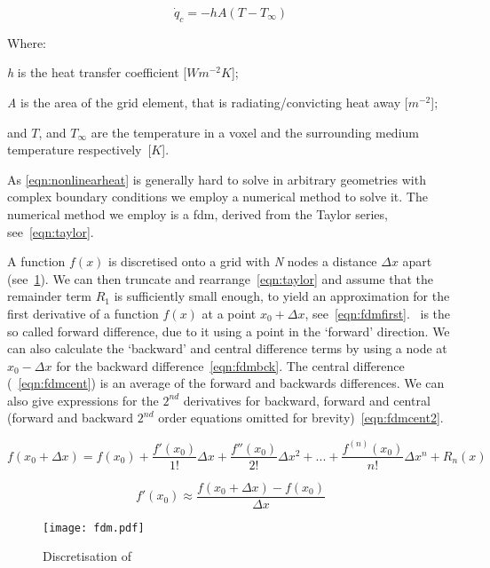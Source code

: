 \begin{equation}
\dot{q}_c = -hA(T - T_\infty)
\label{eqn:bceqns}
\end{equation}

\noindent Where:

	\indent \textit{h} is the heat transfer coefficient [$W m^{-2} K$];
	
	\indent \textit{A} is the area of the grid element, that is radiating/convicting heat away [$m^{-2}$];
	
	\indent and $T$, and $T_\infty$ are the temperature in a voxel and the surrounding medium temperature respectively~[$K$].
	
	\medskip

As \cref{eqn:nonlinearheat} is generally hard to solve in arbitrary geometries with complex boundary conditions we employ a numerical method to solve it.
The numerical method we employ is a \gls{fdm}, derived from the Taylor series, see~\cref{eqn:taylor}. 


A function $f(x)$ is discretised onto a grid with \textit{N} nodes a distance $\Delta x$ apart (see~\cref{fig:fdmexplain}). We can then truncate and rearrange~\cref{eqn:taylor} and assume that the remainder term $R_1$ is sufficiently small enough, to yield an approximation for the first derivative of a function $f(x)$ at a point $x_0+\Delta x$, see~\cref{eqn:fdmfirst}.~ is the so called forward difference, due to it using a point in the `forward' direction. We can also calculate the `backward' and central difference terms by using a node at $x_0-\Delta x$ for the backward difference~\cref{eqn:fdmbck}. The central difference (~\cref{eqn:fdmcent}) is an average of the forward and backwards differences. We can also give expressions for the $2^{nd}$ derivatives for backward, forward and central (forward and backward $2^{nd}$ order equations omitted for brevity)~\cref{eqn:fdmcent2}.

\begin{equation}
f(x_0+\Delta x)=f(x_0) + \frac{f'(x_0)}{1!}\Delta x + \frac{f''(x_0)}{2!}\Delta x^2+...+ \frac{f^{(n)}(x_0)}{n!}\Delta x^n+R_n(x)
\label{eqn:taylor}
\end{equation}

\begin{equation}
f'(x_0) \approx \frac{f(x_0+\Delta x)-f(x_0)}{\Delta x}
\label{eqn:fdmfirst}
\end{equation}

\begin{figure}
  \begin{center}
    \texttt{[image: fdm.pdf]}
  \end{center}
  \caption{Discretisation of }\label{fig:fdmexplain}

\end{figure}

